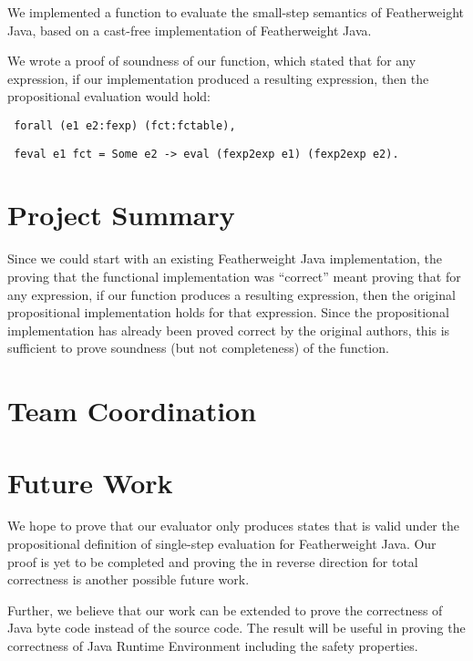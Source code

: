 \documentclass{article}
\begin{document}
We implemented a function to evaluate the small-step semantics of Featherweight Java, based on a cast-free implementation of Featherweight Java\cite{castfree}.

We wrote a proof of soundness of our function, which stated that for any expression, if our implementation produced a resulting expression, then the propositional evaluation would hold:

\texttt{
forall (e1 e2:fexp) (fct:fctable),
}

\texttt{
    feval e1 fct = Some e2 -> eval (fexp2exp e1) (fexp2exp e2).
}

\section{Project Summary}

Since we could start with an existing Featherweight Java implementation, the proving that the functional implementation was ``correct'' meant proving that for any expression, if our function produces a resulting expression, then the original propositional implementation holds for that expression.  Since the propositional implementation has already been proved correct by the original authors, this is sufficient to prove soundness (but not completeness) of the function.

\section{Team Coordination}

\section{Future Work}

We hope to prove that our evaluator only produces states that is valid under the propositional definition of single-step evaluation for Featherweight Java. Our proof is yet to be completed and proving the in reverse direction for total correctness is another possible future work.

Further, we believe that our work can be extended to prove the correctness of Java byte code instead of the source code. The result will be useful in proving the correctness of Java Runtime Environment including the safety properties.

{}

\end{document}
